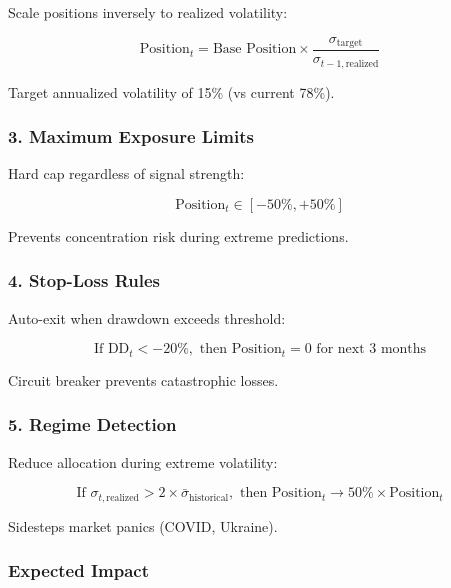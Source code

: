 \documentclass[12pt,a4paper]{article}
\begin{document}
Scale positions inversely to realized volatility:

\begin{equation}
\text{Position}_t = \text{Base Position} \times \frac{\sigma_{\text{target}}}{\sigma_{t-1,\text{realized}}}
\end{equation}

Target annualized volatility of 15\% (vs current 78\%).

\subsubsection{3. Maximum Exposure Limits}

Hard cap regardless of signal strength:

\begin{equation}
\text{Position}_t \in [-50\%, +50\%]
\end{equation}

Prevents concentration risk during extreme predictions.

\subsubsection{4. Stop-Loss Rules}

Auto-exit when drawdown exceeds threshold:

\begin{equation}
\text{If } \text{DD}_t < -20\%, \text{ then Position}_t = 0 \text{ for next 3 months}
\end{equation}

Circuit breaker prevents catastrophic losses.

\subsubsection{5. Regime Detection}

Reduce allocation during extreme volatility:

\begin{equation}
\text{If } \sigma_{t,\text{realized}} > 2 \times \bar{\sigma}_{\text{historical}}, \text{ then Position}_t \rightarrow 50\% \times \text{Position}_t
\end{equation}

Sidesteps market panics (COVID, Ukraine).

\subsubsection{Expected Impact}
\end{document}
